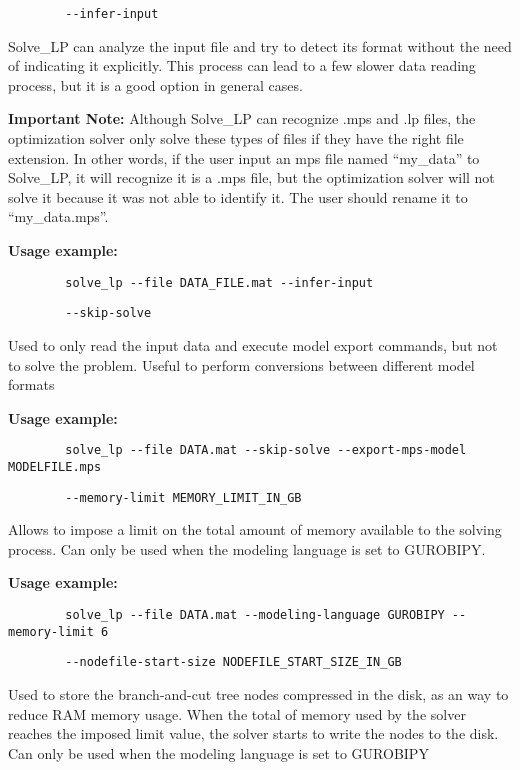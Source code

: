 \documentclass[12pt,hidelinks]{article}
\begin{document}
	{\color{mordantred19}
	\begin{verbatim}
		--infer-input
	\end{verbatim}
	} Solve\_LP can analyze the input file and try to detect its format without the need of indicating it explicitly. This process can lead to a few slower data reading process, but it is a good option in general cases.

	\textbf{Important Note:} Although Solve\_LP can recognize .mps and .lp files, the optimization solver only solve these types of files if they have the right file extension. In other words, if the user input an mps file named ``my\_data'' to Solve\_LP, it will recognize it is a .mps file, but the optimization solver will not solve it because it was not able to identify it. The user should rename it to ``my\_data.mps''.

	\textbf{Usage example:} 
	\begin{verbatim}
		solve_lp --file DATA_FILE.mat --infer-input
	\end{verbatim}

	{\color{mordantred19}
	\begin{verbatim}
		--skip-solve
	\end{verbatim}
	} Used to only read the input data and execute model export commands, but not to solve the problem. Useful to perform conversions between different model formats

	\textbf{Usage example:} 
	\begin{verbatim}
		solve_lp --file DATA.mat --skip-solve --export-mps-model MODELFILE.mps
	\end{verbatim}

	{\color{mordantred19}
	\begin{verbatim}
		--memory-limit MEMORY_LIMIT_IN_GB
	\end{verbatim}
	} Allows to impose a limit on the total amount of memory available to the solving process. Can only be used when the modeling language is set to GUROBIPY.

	\textbf{Usage example:} 
	\begin{verbatim}
		solve_lp --file DATA.mat --modeling-language GUROBIPY --memory-limit 6
	\end{verbatim}

	{\color{mordantred19}
	\begin{verbatim}
		--nodefile-start-size NODEFILE_START_SIZE_IN_GB
	\end{verbatim}
	} Used to store the branch-and-cut tree nodes compressed in the disk, as an way to reduce RAM memory usage. When the total of memory used by the solver reaches the imposed limit value, the solver starts to write the nodes to the disk. Can only be used when the modeling language is set to GUROBIPY
\end{document}
